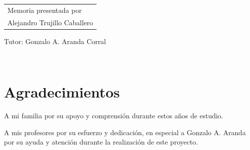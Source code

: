 
\vspace*{4cm}

\vfill


\hspace*{.5\textwidth}
\normalsize
\begin{tabular}{l}
Memoria presentada por\\
Alejandro Trujillo Caballero\\


\end{tabular} \par


Tutor:
Gonzalo A. Aranda Corral\newline


\newpage
\thispagestyle{empty}
\mbox{ }



\newpage
\chapter*{Agradecimientos}
\thispagestyle{empty}

A mi familia por su apoyo y comprensión durante estos años de estudio.

A mis profesores por su esfuerzo y dedicación, en especial a Gonzalo A. Aranda por su ayuda y atención durante la realización de este proyecto.


\newpage
\thispagestyle{empty}
\mbox{ }
\clearpage

